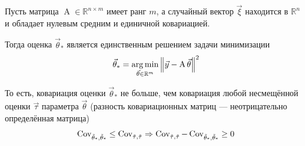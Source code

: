 \begin{theorem}
    \label{theorem:gaussMarkov}
    Пусть матрица $\operatorname{A} \in \mathbb{R}^{n \times m}$ имеет ранг $m$,
    а случайный вектор $\vec{\xi}$ находится в $\mathbb{R}^n$ и обладает нулевым
    средним и единичной ковариацией.

    Тогда оценка $\vec{\theta}_*$ является единственным решением задачи
    минимизации
    \begin{align*}
        \vec{\theta}_*
        = \argminof{\left\| \vec{y} - \operatorname{A} \vec{\theta} \right\|^2}{
            \vec{\theta} \in \mathbb{R}^m}
    \end{align*}

    То есть, ковариация оценки $\vec{\theta}_*$ не больше, чем ковариация любой
    несмещённой оценки $\vec{\tau}$ параметра $\vec{\theta}$ (разность
    ковариационных матриц --- неотрицательно определённая матрица)
    \begin{align*}
        \dCov{\vec{\theta}_*} \le \dCov{\vec{\tau}}
        \Rightarrow \dCov{\vec{\tau}} - \dCov{\vec{\theta}_*} \ge 0
    \end{align*}
\end{theorem}
